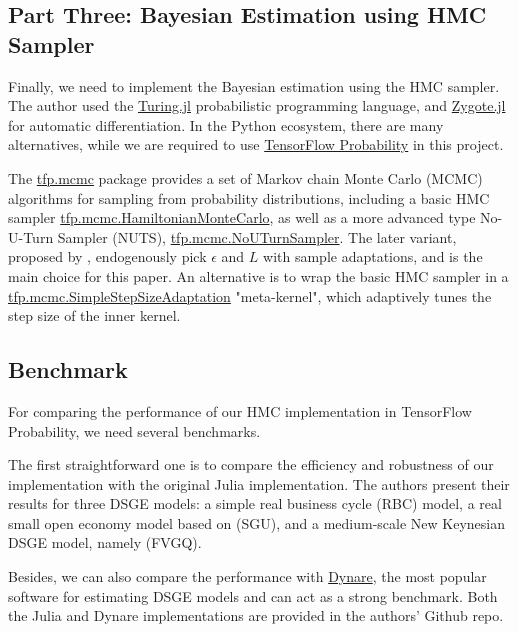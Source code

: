 \documentclass[12pt]{article}
\begin{document}
\subsection*{Part Three: Bayesian Estimation using HMC Sampler}
Finally, we need to implement the Bayesian estimation using the HMC sampler. The author used the \href{https://turing.ml/}{Turing.jl} probabilistic programming language, and \href{https://github.com/FluxML/Zygote.jl}{Zygote.jl} for automatic differentiation. In the Python ecosystem, there are many alternatives, while we are required to use \href{https://www.tensorflow.org/probability}{TensorFlow Probability} in this project.

The \href{https://www.tensorflow.org/probability/api_docs/python/tfp/mcmc}{tfp.mcmc} package provides a set of Markov chain Monte Carlo (MCMC) algorithms for sampling from probability distributions, including a basic HMC sampler \href{https://www.tensorflow.org/probability/api_docs/python/tfp/mcmc/HamiltonianMonteCarlo}{tfp.mcmc.HamiltonianMonteCarlo}, as well as a more advanced type No-U-Turn Sampler (NUTS), \href{https://www.tensorflow.org/probability/api_docs/python/tfp/mcmc/NoUTurnSampler}{tfp.mcmc.NoUTurnSampler}. The later variant, proposed by \citet{hoffman2014no}, endogenously pick $\epsilon$ and $L$ with sample adaptations, and is the main choice for this paper. An alternative is to wrap the basic HMC sampler in a \href{https://www.tensorflow.org/probability/api_docs/python/tfp/mcmc/SimpleStepSizeAdaptation}{tfp.mcmc.SimpleStepSizeAdaptation} "meta-kernel", which adaptively tunes the step size of the inner kernel.

\subsection*{Benchmark}
For comparing the performance of our HMC implementation in TensorFlow Probability, we need several benchmarks.

The first straightforward one is to compare the efficiency and robustness of our implementation with the original Julia implementation. The authors present their results for three DSGE models: a simple real business cycle (RBC) model, a real small open economy model based on \citet{schmitt2003closing} (SGU), and a medium-scale New Keynesian DSGE model, namely \citet{fernandez-villaverdeEstimatingDSGEModels2021} (FVGQ).

Besides, we can also compare the performance with \href{https://www.dynare.org/}{Dynare}, the most popular software for estimating DSGE models and can act as a strong benchmark. Both the Julia and Dynare implementations are provided in the authors' Github repo.
\end{document}
